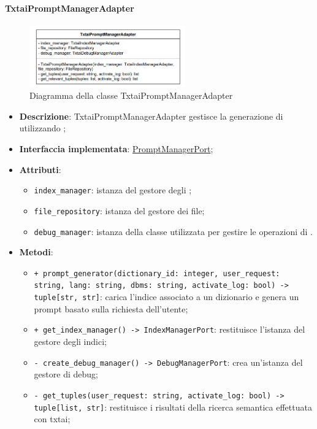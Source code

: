 \paragraph{TxtaiPromptManagerAdapter} \label{TxtaiPromptManagerAdapter}
\begin{figure}[H]
    \centering
    \includegraphics[width=0.6\textwidth]{assets/Backend/txtai_prompt_manager_adapter.png}
    \caption{Diagramma della classe TxtaiPromptManagerAdapter}
  \end{figure}
\begin{itemize}
    \item \textbf{Descrizione}: TxtaiPromptManagerAdapter gestisce la generazione di  utilizzando ;
    \item \textbf{Interfaccia implementata}: \hyperref[PromptManagerPort]{PromptManagerPort};
    \item \textbf{Attributi}:
    \begin{itemize}
        \item \texttt{index\_manager}: istanza del gestore degli ;
        \item \texttt{file\_repository}: istanza del gestore dei file;
        \item \texttt{debug\_manager}: istanza della classe utilizzata per gestire le operazioni di .
    \end{itemize}
    \item \textbf{Metodi}:
    \begin{itemize}
        \item \texttt{+ prompt\_generator(dictionary\_id: integer, user\_request: string, lang: string, dbms: string, activate\_log: bool) -> tuple[str, str]}: carica l'indice associato a un dizionario e genera un prompt basato sulla richiesta dell'utente;
        \item \texttt{+ get\_index\_manager() -> IndexManagerPort}: restituisce l'istanza del gestore degli indici;
        \item \texttt{- create\_debug\_manager() -> DebugManagerPort}: crea un'istanza del gestore di debug;
        \item \texttt{- get\_tuples(user\_request: string, activate\_log: bool) -> tuple[list, str]}: restituisce i risultati della ricerca semantica effettuata con txtai;

\end{itemize}
\end{itemize}
